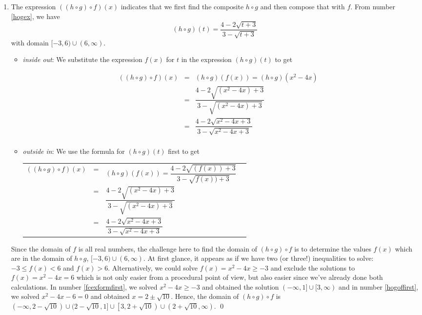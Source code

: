 \documentclass{ximera}
\begin{document}
\begin{example}
\begin{enumerate}
\item  The expression $((h \circ g) \circ f)(x)$ indicates that we first find the composite $h \circ g$ and then compose that with $f$.  From number \ref{hogex}, we have \[(h \circ g)(t) = \frac{4-2\sqrt{t+3}}{3-\sqrt{t+3}}\]  with domain $[-3, 6) \cup (6, \infty)$.
\begin{itemize}

\item  \textit{inside out}: We substitute the expression $f(x)$ for $t$ in the expression $(h \circ g)(t)$ to get 

\[ \begin{array}{rclr}
((h \circ g) \circ f)(x) & = & (h \circ g)(f(x)) = (h \circ g)\left(x^2-4x\right) & \\ [2pt]
                         & = & \dfrac{4-2\sqrt{\left(x^2-4x\right)+3}}{3-\sqrt{\left(x^2-4x\right)+3}} & \\ [20pt]
                         & = & \dfrac{4 - 2\sqrt{x^2-4x+3}}{3 - \sqrt{x^2-4x+3}} & \\ \end{array}\]

\item  \textit{outside in}:  We use the formula for $(h \circ g)(t)$ first to get
\begin{longtable}{rclr} $((h \circ g) \circ f)(x)$ & = & $(h \circ g)(f(x))=\dfrac{4-2\sqrt{(f(x))+3}}{3-\sqrt{f(x))+3}}$  & \\ [20pt]
  & = & $\dfrac{4 - 2\sqrt{\left(x^2-4x\right)+3}}{3 - \sqrt{\left(x^2-4x\right)+3}}$ & \\[20pt]
 & = & $\dfrac{4 - 2\sqrt{x^2-4x+3}}{3 - \sqrt{x^2-4x+3}}$ & \\
 \end{longtable}
 
 \end{itemize}

 
Since the domain of $f$ is all real numbers, the challenge here to find the domain of $(h \circ g) \circ f$ is to determine the values $f(x)$ which are in the domain of  $h \circ g$,  $[-3, 6) \cup (6, \infty)$.  At first glance, it appears as if we have two (or three!) inequalities to solve:  $-3 \leq f(x) < 6$ and $f(x) > 6$.  Alternatively, we could solve $f(x) = x^2-4x \geq -3$ and exclude the solutions to $f(x) = x^2-4x = 6$ which is not only easier from a procedural point of view, but also easier since we've already done both calculations.   In number \ref{fcexformfirst}, we solved  $x^2-4x \geq -3$ and obtained the solution $(-\infty, 1] \cup [3, \infty)$ and in number \ref{hogoffirst}, we solved $x^2-4x-6 = 0$ and obtained $x = 2 \pm \sqrt{10}$.  Hence, the domain of $(h \circ g) \circ f$ is  $(-\infty, 2 -\sqrt{10}) \cup (2 - \sqrt{10}, 1] \cup \left[3, 2 + \sqrt{10}\right) \cup \left(2+\sqrt{10}, \infty\right)$. \qed

\end{enumerate}

\label{functioncompex1}
\end{example}
\end{document}
